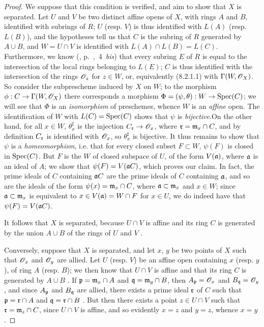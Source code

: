 \begin{proof}
\label{proof-1.8.2.2}
We suppose that this condition is verified, and aim to show that $X$ is separated.
Let $U$ and $V$ be two distinct affine opens of $X$, with rings $A$ and $B$,
identified with subrings of $R$; $U$ (resp. $V$) is thus identified 
with $L(A)$ (resp. $L(B)$), and the hypotheses tell us  that $C$ is
the subring of $R$ generated by $A\cup B$, and $W=U\cap V$ is identified with
$L(A)\cap L(B)=L(C)$. Furthermore, we know
(\cite{I-1}, p.~,~4~\emph{bis}) that every subring $E$ of $R$ is
equal to the intersection of the local rings belonging to $L(E)$; $C$ is thus
identified with the intersection of the rings $\mathscr{O}_z$ for $z\in W$, or,
equivalently (8.2.1.1) with $\Gamma(W,\mathscr{O}_X)$. So consider the subprescheme
induced by $X$ on $W$; to the  morphism $\phi:
C\to\Gamma(W,\mathscr{O}_X)$ there corresponds  a morphism
$\Phi=(\psi,\theta):W\to{\mathop{\mathrm{Spec}}\nolimits}(C)$; we will see that $\Phi$ is an
\emph{isomorphism} of preschemes, whence $W$ is an \emph{affine} open. The
identification of $W$ with $L(C)={\mathop{\mathrm{Spec}}\nolimits}(C)$ shows that $\psi$ is
\emph{bijective}.On the other hand, for all $x\in W$, $\theta_x^\sharp$ is the
injection $C_\mathfrak{r}\to\mathscr{O}_x$, where $\mathfrak{r}=\mathfrak{m}_x\cap C$,
and by definition $C_\mathfrak{r}$ is identified with $\mathscr{O}_x$, so $\theta_x^\sharp$
is bijective. It thus remains to show that $\psi$ is a \emph{homeomorphism},
i.e. that for every closed subset $F\subset W$, $\psi(F)$ is closed in
${\mathop{\mathrm{Spec}}\nolimits}(C)$. But $F$ is the  $W$ of closed subspace of $U$,
of the form $V(\mathfrak{a})$, where $\mathfrak{a}$ is an ideal of $A$; we show
that $\psi(F)=V(\mathfrak{a}C)$, which proves our claim. In fact, the prime
ideals of $C$ containing $\mathfrak{a}C$ are the prime ideals of $C$ containing
$\mathfrak{a}$, and so are the ideals of the form $\psi(x)=\mathfrak{m}_x\cap
C$, where $\mathfrak{a}\subset\mathfrak{m}_x$ and $x\in W$; since
$\mathfrak{a}\subset\mathfrak{m}_x$ is equivalent to $x\in V(\mathfrak{a})=W\cap
F$ for $x\in U$, we do indeed have that $\psi(F)=V(\mathfrak{a}C)$.

It follows that $X$ is separated, because $U\cap V$ is affine and its ring $C$
is generated by the union $A\cup B$ of the rings of $U$ and $V$ .

Conversely, suppose that $X$ is separated, and let $x$, $y$ be two points of $X$
such that $\mathscr{O}_x$ and $\mathscr{O}_y$ are allied. Let $U$ (resp. $V$) be an affine open
containing $x$ (resp. $y$), of ring $A$ (resp. $B$); we then know that $U\cap V$
is affine and that its ring $C$ is generated by $A\cup B$ . If
$\mathfrak{p}=\mathfrak{m}_x\cap A$ and $\mathfrak{q}=\mathfrak{m}_y\cap B$,
then $A_\mathfrak{p}=\mathscr{O}_x$ and $B_\mathfrak{q}=\mathscr{O}_y$, and since $A_\mathfrak{p}$
and $B_\mathfrak{q}$ are allied, there exists a prime ideal $\mathfrak{r}$ of
$C$ such that $\mathfrak{p}=\mathfrak{r}\cap A$ and
$\mathfrak{q}=\mathfrak{r}\cap B$ . But then there exists a point
$z\in U\cap V$ such that $\mathfrak{r}=\mathfrak{m}_z\cap C$, since $U\cap V$ is
affine, and so evidently $x=z$ and $y=z$, whence $x=y$.
\end{proof}


